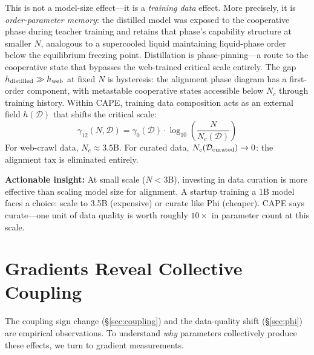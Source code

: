 \documentclass[11pt]{article}
\begin{document}
This is not a model-size effect---it is a \emph{training data} effect.
More precisely, it is \emph{order-parameter memory}: the distilled model was exposed to the cooperative phase during teacher training and retains that phase's capability structure at smaller $N$, analogous to a supercooled liquid maintaining liquid-phase order below the equilibrium freezing point.
Distillation is phase-pinning---a route to the cooperative state that bypasses the web-trained critical scale entirely.
The gap $h_{\rm distilled} \gg h_{\rm web}$ at fixed $N$ is hysteresis: the alignment phase diagram has a first-order component, with metastable cooperative states accessible below $N_c$ through training history.
Within CAPE, training data composition acts as an external field $h(\mathcal{D})$
that shifts the critical scale:
\begin{equation}
  \gamma_{12}(N, \mathcal{D}) = \gamma_0(\mathcal{D}) \cdot \log_{10}\!\left(\frac{N}{N_c(\mathcal{D})}\right)
  \label{eq:field}
\end{equation}
For web-crawl data, $N_c \approx 3.5$B. For curated data, $N_c(\mathcal{D}_{\rm curated}) \to 0$:
the alignment tax is eliminated entirely.

\textbf{Actionable insight:} At small scale ($N < 3$B), investing in data curation
is more effective than scaling model size for alignment.
A startup training a 1B model faces a choice: scale to 3.5B (expensive) or curate like Phi (cheaper).
CAPE says curate---one unit of data quality is worth roughly $10\times$ in parameter count at this scale.

\section{Gradients Reveal Collective Coupling}
\label{sec:gradients}

The coupling sign change (\S\ref{sec:coupling}) and the data-quality shift (\S\ref{sec:phi})
are empirical observations.
To understand \emph{why} parameters collectively produce these effects, we turn to gradient measurements.
\end{document}
